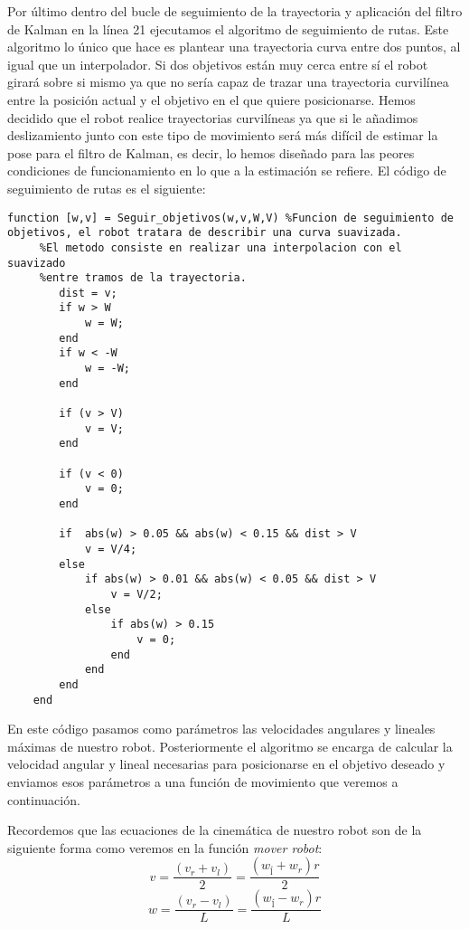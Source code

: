 Por último dentro del bucle de seguimiento de la trayectoria y aplicación del filtro de Kalman en la línea 21 ejecutamos el algoritmo de seguimiento de rutas.
Este algoritmo lo único que hace es plantear una trayectoria curva entre dos puntos, al igual que un interpolador. Si dos objetivos están muy cerca entre sí el robot girará sobre si mismo ya que no sería capaz de trazar una trayectoria curvilínea entre la posición actual y el objetivo en el que quiere posicionarse.
%
%
%
Hemos decidido que el robot realice trayectorias curvilíneas ya que si le añadimos deslizamiento junto con este tipo de movimiento será más difícil de estimar la pose para el filtro de Kalman, es decir, lo hemos diseñado para las peores condiciones de funcionamiento en lo que a la estimación se refiere.
El código de seguimiento de rutas es el siguiente:
\begin{lstlisting}[frame=single]
function [w,v] = Seguir_objetivos(w,v,W,V) %Funcion de seguimiento de objetivos, el robot tratara de describir una curva suavizada.
     %El metodo consiste en realizar una interpolacion con el suavizado
     %entre tramos de la trayectoria.
        dist = v;
        if w > W
            w = W;
        end
        if w < -W
            w = -W;
        end 

        if (v > V)
            v = V;
        end

        if (v < 0)
            v = 0;
        end

        if  abs(w) > 0.05 && abs(w) < 0.15 && dist > V
            v = V/4;
        else
            if abs(w) > 0.01 && abs(w) < 0.05 && dist > V
                v = V/2;
            else
                if abs(w) > 0.15
                    v = 0;
                end
            end
        end
    end
\end{lstlisting}
En este código pasamos como parámetros las velocidades angulares y lineales máximas de nuestro robot.
Posteriormente el algoritmo se encarga de calcular la velocidad angular y lineal necesarias para posicionarse en el objetivo deseado y enviamos esos parámetros a una función de movimiento que veremos a continuación.

Recordemos que las ecuaciones de la cinemática de nuestro robot son de la siguiente forma como veremos en la función \textit{mover robot}:
%
%
%
\begin{equation}\label{Ec:Cinematica_1}
v = \frac{(v_{r}+v_{l})}{2} = \frac{(w_{ĺ}+w_{r})r}{2}
\end{equation}
\begin{equation}\label{Ec:Cinematica_2}
w = \frac{(v_{r}-v_{l})}{L} = \frac{(w_{ĺ}-w_{r})r}{L}
\end{equation}

